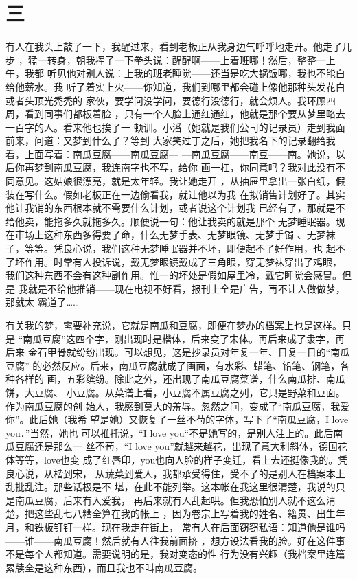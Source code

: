 \section{三}

有人在我头上敲了一下，我醒过来，看到老板正从我身边气呼呼地走开。他走了几步
，猛一转身，朝我挥了一下拳头说：醒醒啊——上着班哪！然后，整整一上午，我都
听见他对别人说：上我的班老睡觉——还当是吃大锅饭哪，我也不能白给他薪水。我
听了着实上火——你知道，我们到哪里都会碰上像他那种头发花白或者头顶光秃秃的
家伙，要学问没学问，要德行没德行，就会烦人。我环顾四周，看到同事们都板着脸
，只有一个人脸上通红通红，他就是那个要从梦里略去一百字的人。看来他也挨了一
顿训。小潘（她就是我们公司的记录员）走到我面前来，问道：又梦到什么了？等到
大家笑过丁之后，她把我名下的记录翻给我看，上面写着：南瓜豆腐——南瓜豆腐—
—南瓜豆腐——南豆——南。她说，以后你再梦到南瓜豆腐，我连南字也不写，给你
画一杠，你同意吗？我对此没有不同意见。这姑娘很漂亮，就是太年轻。我让她走开
，从抽屉里拿出一张白纸，假装在写什么。假如老板正在一边偷看我，就让他以为我
在拟销售计划好了。其实他让我销的东西根本就不需要什么计划，或者说这个计划我
已经有了，那就是不给他卖，能拖多久就拖多久。顺便说一句：他让我卖的就是那个
无梦睡眠器。现在市场上这种东西多得要了命，什么无梦手表、无梦眼镜、无梦手镯
、无梦袜子，等等。凭良心说，我们这种无梦睡眠器并不坏，即便起不了好作用，也
起不了坏作用。时常有人投诉说，戴无梦眼镜戴成了三角眼，穿无梦袜穿出了鸡眼，
我们这种东西不会有这种副作用。惟一的坏处是假如屋里冷，戴它睡觉会感冒。但是
我就是不给他推销——现在电视不好看，报刊上全是广告，再不让人做做梦，那就太
霸道了……

有关我的梦，需要补充说，它就是南瓜和豆腐，即便在梦办的档案上也是这样。只是
“南瓜豆腐”这四个字，刚出现时是楷体，后来变了宋体。再后来成了隶字，再后来
金石甲骨就纷纷出现。可以想见，这是抄录员对年复一年、日复一日的“南瓜豆腐”
的必然反应。后来，南瓜豆腐就成了画面，有水彩、蜡笔、铅笔、钢笔，各种各样的
画，五彩缤纷。除此之外，还出现了南瓜豆腐菜谱，什么南瓜排、南瓜饼，大豆腐、
小豆腐。从菜谱上看，小豆腐不属豆腐之列，它只是野菜和豆面。作为南瓜豆腐的创
始人，我感到莫大的羞辱。忽然之间，变成了“南瓜豆腐，我爱你”。此后她（我希
望是她）又恢复了一丝不苟的字体，写下了“南瓜豆腐，I love you．”当然，她也
可以推托说，“I love you“不是她写的，是别人注上的。此后南瓜豆腐还是那么一
丝不苟，“I love you”就越来越花，出现了意大利斜体，德国花体等等，love也变
成了红唇印，you也向人脸的样子变迁，看上去还挺像我的。凭良心说，从楷到宋，
从蔬菜到爱人，我都承受得住，受不了的是别人在档案本上乱批乱注。那些话极是不
堪，在此不能列举。这本帐在我这里很清楚，我说的只是南瓜豆腐，后来有入爱我，
再后来就有人乱起哄。但我恐怕别人就不这么清楚，把这些乱七八糟全算在我的帐上
，因为卷宗上写着我的姓名、籍贯、出生年月，和铁板钉钉一样。现在我走在街上，
常有人在后面窃窃私语：知道他是谁吗——谁——南瓜豆腐！然后就有人往我前面挤
，想方设法看我的脸。好在这件事不是每个人都知道。需要说明的是，我对变态的性
行为没有兴趣（我档案里连篇累牍全是这种东西），而且我也不叫南瓜豆腐。

